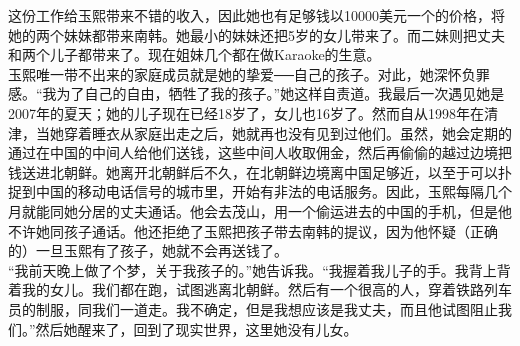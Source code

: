 这份工作给玉熙带来不错的收入，因此她也有足够钱以10000美元一个的价格，将她的两个妹妹都带来南韩。她最小的妹妹还把5岁的女儿带来了。而二妹则把丈夫和两个儿子都带来了。现在姐妹几个都在做Karaoke的生意。\\

玉熙唯一带不出来的家庭成员就是她的挚爱──自己的孩子。对此，她深怀负罪感。“我为了自己的自由，牺牲了我的孩子。”她这样自责道。我最后一次遇见她是2007年的夏天；她的儿子现在已经18岁了，女儿也16岁了。然而自从1998年在清津，当她穿着睡衣从家庭出走之后，她就再也没有见到过他们。虽然，她会定期的通过在中国的中间人给他们送钱，这些中间人收取佣金，然后再偷偷的越过边境把钱送进北朝鲜。她离开北朝鲜后不久，在北朝鲜边境离中国足够近，以至于可以扑捉到中国的移动电话信号的城市里，开始有非法的电话服务。因此，玉熙每隔几个月就能同她分居的丈夫通话。他会去茂山，用一个偷运进去的中国的手机，但是他不许她同孩子通话。他还拒绝了玉熙把孩子带去南韩的提议，因为他怀疑（正确的）一旦玉熙有了孩子，她就不会再送钱了。\\

“我前天晚上做了个梦，关于我孩子的。”她告诉我。“我握着我儿子的手。我背上背着我的女儿。我们都在跑，试图逃离北朝鲜。然后有一个很高的人，穿着铁路列车员的制服，同我们一道走。我不确定，但是我想应该是我丈夫，而且他试图阻止我们。”然后她醒来了，回到了现实世界，这里她没有儿女。\\

